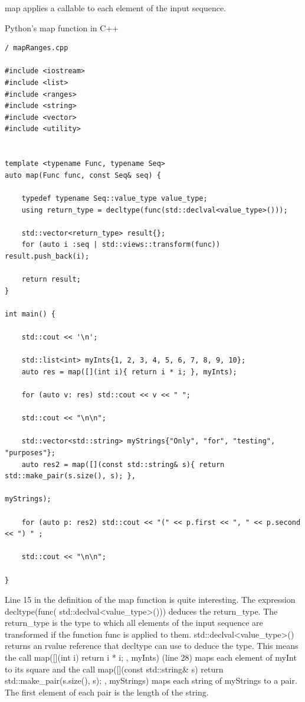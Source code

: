map applies a callable to each element of the input sequence.

\noindent
Python’s map function in C++
\begin{lstlisting}[style=styleCXX]
/ mapRanges.cpp

#include <iostream>
#include <list>
#include <ranges>
#include <string>
#include <vector>
#include <utility>


template <typename Func, typename Seq>
auto map(Func func, const Seq& seq) {

	typedef typename Seq::value_type value_type;
	using return_type = decltype(func(std::declval<value_type>()));
	
	std::vector<return_type> result{};
	for (auto i :seq | std::views::transform(func)) result.push_back(i);
	
	return result;
}

int main() {

	std::cout << '\n';
	
	std::list<int> myInts{1, 2, 3, 4, 5, 6, 7, 8, 9, 10};
	auto res = map([](int i){ return i * i; }, myInts);
	
	for (auto v: res) std::cout << v << " ";
	
	std::cout << "\n\n";
	
	std::vector<std::string> myStrings{"Only", "for", "testing", "purposes"};
	auto res2 = map([](const std::string& s){ return std::make_pair(s.size(), s); },
	                                                                myStrings);
	
	for (auto p: res2) std::cout << "(" << p.first << ", " << p.second << ") " ;
	
	std::cout << "\n\n";

}
\end{lstlisting}

Line 15 in the definition of the map function is quite interesting. The expression decltype(func( std::declval<value\_type>())) deduces the return\_type. The return\_type is the type to which all elements of the input sequence are transformed if the function func is applied to them. std::declval<value\_type>() returns an rvalue reference that decltype can use to deduce the type. This means the call map([](int i){ return i * i; }, myInts) (line 28) maps each element of myInt to its square and the call map([](const std::string\& s){ return std::make\_pair(s.size(), s); }, myStrings) maps each string of myStrings to a pair. The first element of each pair is the length of the string.


